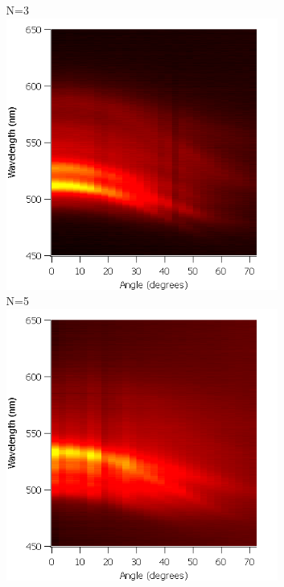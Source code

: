 \documentclass{beamer}
\begin{document}
\begin{frame}
\begin{columns}
\begin{column}{0.5\textwidth}
				\end{column}
				\begin{column}{0.5\textwidth}
					\centering
					N=3\\
					\includegraphics[width=0.7\textwidth]{images/n3_heatmap.png}\\
					N=5\\
					\includegraphics[width=0.7\textwidth]{images/n5_heatmap.png}
				\end{column}
            \end{columns}
        \end{frame}
        
\end{document}

